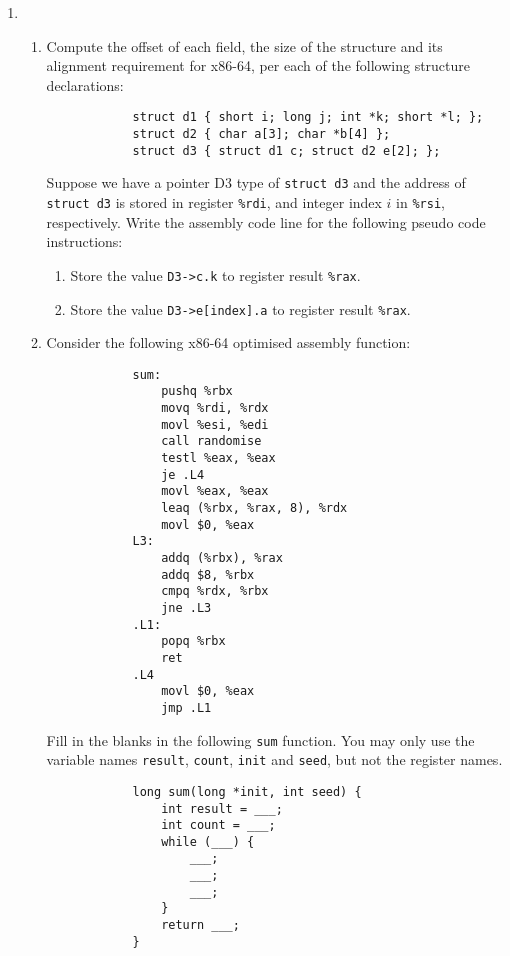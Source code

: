 \documentclass[11pt]{article}
\begin{document}
\begin{enumerate}
    \item \begin{enumerate}
        \item Compute the offset of each field, the size of the structure and its alignment requirement for x86-64, per each of the following structure declarations:
        \begin{verbatim}
            struct d1 { short i; long j; int *k; short *l; };
            struct d2 { char a[3]; char *b[4] };
            struct d3 { struct d1 c; struct d2 e[2]; }; \end{verbatim}
        Suppose we have a pointer D3 type of \texttt{struct d3} and the address of \texttt{struct d3} is stored in register \texttt{\%rdi}, and integer index $i$ in \texttt{\%rsi}, respectively. Write the assembly code line for the following pseudo code instructions:
        \begin{enumerate}
            \item Store the value \texttt{D3->c.k} to register result \texttt{\%rax}.
            \item Store the value \texttt{D3->e[index].a} to register result \texttt{\%rax}.
        \end{enumerate}

        \item Consider the following x86-64 optimised assembly function:
        \begin{verbatim}
            sum:
                pushq %rbx
                movq %rdi, %rdx
                movl %esi, %edi
                call randomise
                testl %eax, %eax
                je .L4
                movl %eax, %eax
                leaq (%rbx, %rax, 8), %rdx
                movl $0, %eax
            L3:
                addq (%rbx), %rax
                addq $8, %rbx
                cmpq %rdx, %rbx
                jne .L3
            .L1:
                popq %rbx
                ret
            .L4
                movl $0, %eax
                jmp .L1
        \end{verbatim}

        Fill in the blanks in the following \texttt{sum} function. You may only use the variable names \texttt{result}, \texttt{count}, \texttt{init} and \texttt{seed}, but not the register names.
        \begin{verbatim}
            long sum(long *init, int seed) {
                int result = ___;
                int count = ___;
                while (___) {
                    ___;
                    ___;
                    ___;
                }
                return ___;
            }
        \end{verbatim}


\end{enumerate}
\end{enumerate}
\end{document}
